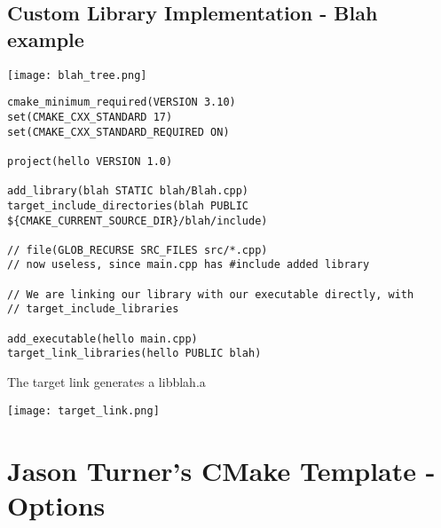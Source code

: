 \documentclass[openany]{report}
\begin{document}
\subsection{Custom Library Implementation - Blah example}

\begin{center}
    \texttt{[image: blah\_tree.png]}
\end{center}

\begin{verbatim}
cmake_minimum_required(VERSION 3.10)
set(CMAKE_CXX_STANDARD 17)
set(CMAKE_CXX_STANDARD_REQUIRED ON)

project(hello VERSION 1.0)

add_library(blah STATIC blah/Blah.cpp)
target_include_directories(blah PUBLIC ${CMAKE_CURRENT_SOURCE_DIR}/blah/include)

// file(GLOB_RECURSE SRC_FILES src/*.cpp)
// now useless, since main.cpp has #include added library

// We are linking our library with our executable directly, with
// target_include_libraries

add_executable(hello main.cpp)
target_link_libraries(hello PUBLIC blah)
\end{verbatim}

The target link generates a libblah.a

\begin{center}
    \texttt{[image: target\_link.png]}
\end{center}

\section{Jason Turner's CMake Template - Options}
\end{document}
